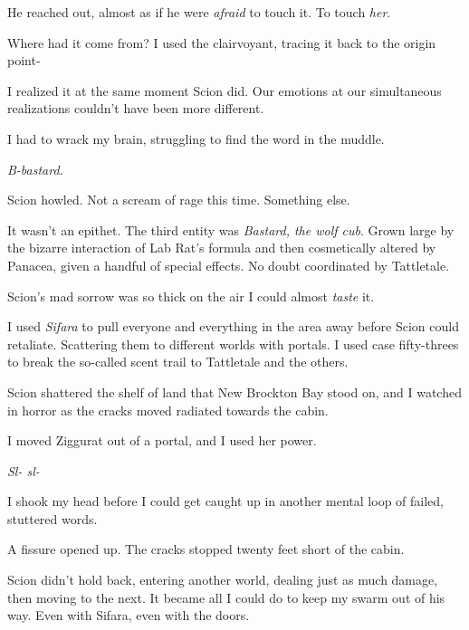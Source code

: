 He reached out, almost as if he were \emph{afraid} to touch it.  To touch \emph{her}.



Where had it come from?  I used the clairvoyant, tracing it back to the origin point-



I realized it at the same moment Scion did.  Our emotions at our simultaneous realizations couldn't have been more different.



I had to wrack my brain, struggling to find the word in the muddle.



\emph{B-bastard}.



Scion howled.  Not a scream of rage this time.  Something else.



It wasn't an epithet.  The third entity was \emph{Bastard, the wolf cub}.  Grown large by the bizarre interaction of Lab Rat's formula and then cosmetically altered by Panacea, given a handful of special effects.  No doubt coordinated by Tattletale.



Scion's mad sorrow was so thick on the air I could almost \emph{taste }it.



I used \emph{Sifara} to pull everyone and everything in the area away before Scion could retaliate.  Scattering them to different worlds with portals.  I used case fifty-threes to break the so-called scent trail to Tattletale and the others.



Scion shattered the shelf of land that New Brockton Bay stood on, and I watched in horror as the cracks moved radiated towards the cabin.



I moved Ziggurat out of a portal, and I used her power.



\emph{Sl- sl-}



I shook my head before I could get caught up in another mental loop of failed, stuttered words.



A fissure opened up.  The cracks stopped twenty feet short of the cabin.



Scion didn't hold back, entering another world, dealing just as much damage, then moving to the next.  It became all I could do to keep my swarm out of his way.  Even with Sifara, even with the doors.



